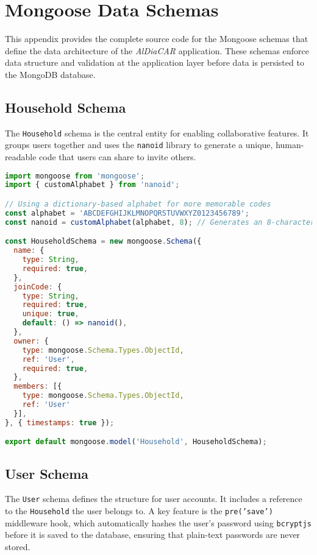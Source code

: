 \chapter{Mongoose Data Schemas}

This appendix provides the complete source code for the Mongoose schemas that define the data architecture of the \textit{AlDiaCAR} application. These schemas enforce data structure and validation at the application layer before data is persisted to the MongoDB database.

\section{Household Schema}
The \texttt{Household} schema is the central entity for enabling collaborative features. It groups users together and uses the \texttt{nanoid} library to generate a unique, human-readable code that users can share to invite others.

\begin{lstlisting}[language=JavaScript, caption={Source code for \texttt{models/Household.js}}, breaklines=true]
import mongoose from 'mongoose';
import { customAlphabet } from 'nanoid';

// Using a dictionary-based alphabet for more memorable codes
const alphabet = 'ABCDEFGHIJKLMNOPQRSTUVWXYZ0123456789';
const nanoid = customAlphabet(alphabet, 8); // Generates an 8-character code like 'A3B5D9F1'

const HouseholdSchema = new mongoose.Schema({
  name: {
    type: String,
    required: true,
  },
  joinCode: {
    type: String,
    required: true,
    unique: true,
    default: () => nanoid(),
  },
  owner: {
    type: mongoose.Schema.Types.ObjectId,
    ref: 'User',
    required: true,
  },
  members: [{
    type: mongoose.Schema.Types.ObjectId,
    ref: 'User'
  }],
}, { timestamps: true });

export default mongoose.model('Household', HouseholdSchema);
\end{lstlisting}

\section{User Schema}
The \texttt{User} schema defines the structure for user accounts. It includes a reference to the \texttt{Household} the user belongs to. A key feature is the \texttt{pre('save')} middleware hook, which automatically hashes the user's password using \texttt{bcryptjs} before it is saved to the database, ensuring that plain-text passwords are never stored.

